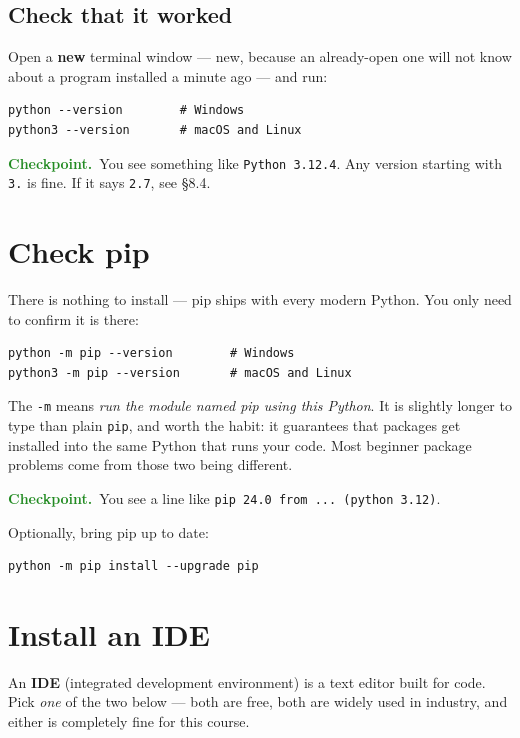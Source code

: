 \documentclass[11pt]{article}
\newcommand{\checkpoint}[1]{\par\smallskip\noindent
  {\small\sffamily\textcolor{ForestGreen}{\textbf{Checkpoint.}}\ #1}\par\smallskip}
\begin{document}
\subsection*{Check that it worked}
Open a \textbf{new} terminal window --- new, because an already-open one will not
know about a program installed a minute ago --- and run:

\begin{lstlisting}
python --version        # Windows
python3 --version       # macOS and Linux
\end{lstlisting}

\checkpoint{You see something like \texttt{Python 3.12.4}. Any version starting
with \texttt{3.} is fine. If it says \texttt{2.7}, see \S8.4.}

\section{Check pip}
There is nothing to install --- pip ships with every modern Python. You only
need to confirm it is there:

\begin{lstlisting}
python -m pip --version        # Windows
python3 -m pip --version       # macOS and Linux
\end{lstlisting}

\noindent The \texttt{-m} means \emph{run the module named pip using this
Python}. It is slightly longer to type than plain \texttt{pip}, and worth the
habit: it guarantees that packages get installed into the same Python that runs
your code. Most beginner package problems come from those two being different.

\checkpoint{You see a line like \texttt{pip 24.0 from ... (python 3.12)}.}

\medskip
\noindent Optionally, bring pip up to date:

\begin{lstlisting}
python -m pip install --upgrade pip
\end{lstlisting}

\section{Install an IDE}
An \textbf{IDE} (integrated development environment) is a text editor built for
code. Pick \emph{one} of the two below --- both are free, both are widely used
in industry, and either is completely fine for this course.
\end{document}
